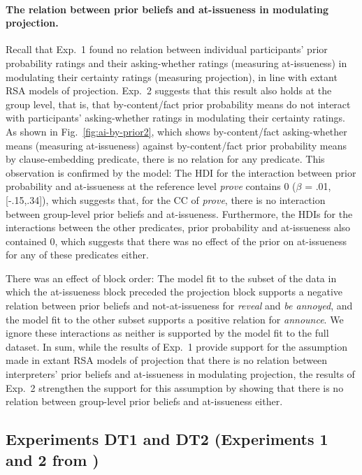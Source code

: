 \documentclass[11pt,fleqn]{article}
\newcommand{\6}{\mbox{$[\hspace*{-.6mm}[$}}
\newcommand{\9}{\mbox{$]\hspace*{-.6mm}]$}}
\begin{document}
\paragraph{The relation between prior beliefs and at-issueness in modulating projection.} Recall that Exp.~1 found no relation between individual participants' prior probability ratings and their asking-whether ratings (measuring at-issueness) in modulating their certainty ratings (measuring projection), in line with extant RSA models of projection. Exp.~2 suggests that this result also holds at the group level, that is, that by-content/fact prior probability means do not interact with participants' asking-whether ratings in modulating their certainty ratings. As shown in Fig.~\ref{fig:ai-by-prior2}, which shows by-content/fact asking-whether means (measuring at-issueness) against by-content/fact prior probability means by clause-embedding predicate, there is no relation for any predicate. This observation is confirmed by the model: The HDI for the interaction between prior probability and at-issueness at the reference level {\em prove} contains 0 ($\beta$ = .01, [-.15,.34]), which suggests that, for the CC of {\em prove}, there is no interaction between group-level prior beliefs and at-issueness. Furthermore, the HDIs for the interactions between the other predicates, prior probability and at-issueness also contained 0, which suggests that there was no effect of the prior on at-issueness for any of these predicates either. 

There was an effect of block order: The model fit to the subset of the data in which the at-issueness block preceded the projection block supports a negative relation between prior beliefs and not-at-issueness for {\em reveal} and {\em be annoyed}, and the model fit to the other subset supports a positive relation for {\em announce}. We ignore these interactions as neither is supported by the model fit to the full dataset. In sum, while the results of Exp.~1 provide support for the assumption made in extant RSA models of projection that there is no relation between interpreters' prior beliefs and at-issueness in modulating projection, the results of Exp.~2 strengthen the support for this assumption by showing that there is no relation between group-level prior beliefs and at-issueness either.

\subsection{Experiments DT1 and DT2 (Experiments 1 and 2 from \citealt{degen-tonhauser-openmind})}\label{s:OMExps}
\end{document}
